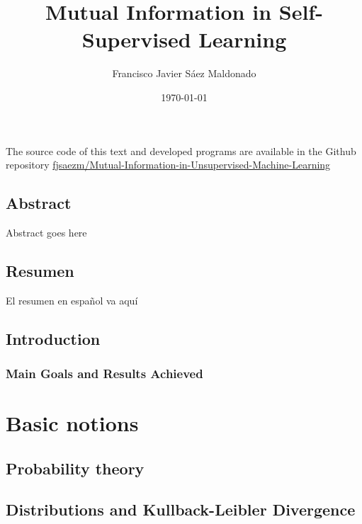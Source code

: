 \documentclass[oneside,openright,titlepage,numbers=noenddot,openany,headinclude,footinclude=true, cleardoublepage=empty,abstractoff,BCOR=5mm,paper=a4,fontsize=11pt, dvipsnames]{scrreprt}
\author{Francisco Javier Sáez Maldonado}
\date{\today}
\title{Mutual Information in Self-Supervised Learning}
\begin{document}
\maketitle


\vspace*{\fill}
\doclicenseThis
The source code of this text and developed programs are available in the Github repository \href{https://github.com/fjsaezm/Mutual-Information-in-Unsupervised-Machine-Learning}{fjsaezm/Mutual-Information-in-Unsupervised-Machine-Learning}

\chapter*{Abstract}
Abstract goes here
\chapter*{Resumen}
El resumen en español va aquí
\chapter*{Introduction}
\section*{Main Goals and Results Achieved}
\newpage


\tableofcontents
\newpage
\listoffigures
\listoftables

\newpage

\part{Basic notions}

\chapter{Probability theory}

\clearpage
\chapter{Distributions and Kullback-Leibler Divergence}

\clearpage
\end{document}
